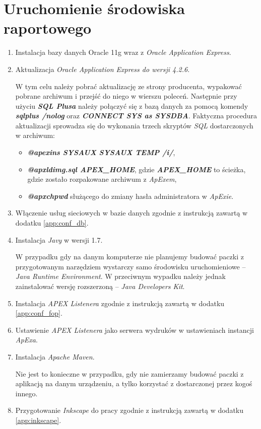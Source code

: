 \documentclass[11pt,a4paper]{article}
\begin{document}
\newpage

\section{Uruchomienie środowiska raportowego} \label{env}
\begin{enumerate}
	\item Instalacja bazy danych Oracle 11g wraz z \emph{Oracle Application Express}.
	\item Aktualizacja \emph{Oracle Application Express do wersji 4.2.6}.

W tym celu należy pobrać aktualizację ze strony producenta, wypakować pobrane archiwum i przejść do niego w wierszu poleceń. Następnie przy użyciu \emph{\textbf{SQL Plusa}} należy połączyć się z bazą danych za pomocą komendy \emph{\textbf{sqlplus /nolog}} oraz \emph{\textbf{CONNECT SYS as SYSDBA}}. Faktyczna procedura aktualizacji sprowadza się do wykonania trzech skryptów \emph{SQL} dostarczonych w archiwum:
\begin{itemize}
		\item \emph{\textbf{@apexins SYSAUX SYSAUX TEMP /i/}},
		\item \emph{\textbf{@apxldimg.sql APEX\_HOME}}, gdzie \emph{\textbf{APEX\_HOME}} to ścieżka, gdzie zostało rozpakowane archiwum z \emph{ApExem},
		\item \emph{\textbf{@apxchpwd}} służącego do zmiany hasła administratora w \emph{ApExie}.
\end{itemize}
	\item Włączenie usług sieciowych w bazie danych zgodnie z instrukcją zawartą w dodatku \ref{app:conf_db}.
	\item Instalacja \emph{Javy} w wersji 1.7.

W przypadku gdy na danym komputerze nie planujemy budować paczki z przygotowanym narzędziem wystarczy samo środowisku uruchomieniowe -- \emph{Java Runtime Environment}. W przeciwnym wypadku należy jednak zainstalować wersję rozszerzoną -- \emph{Java Developers Kit}.
	\item Instalacja \emph{APEX Listenera} zgodnie z instrukcją zawartą w dodatku \ref{app:conf_fop}.
	\item Ustawienie \emph{APEX Listenera} jako serwera wydruków w ustawieniach instancji \emph{ApExa}.
	\item Instalacja \emph{Apache Maven}.

Nie jest to konieczne w przypadku, gdy nie zamierzamy budować paczki z aplikacją na danym urządzeniu, a tylko korzystać z dostarczonej przez kogoś innego. 
	
	\item Przygotowanie \emph{Inkscape} do pracy zgodnie z instrukcją zawartą w dodatku \ref{app:inkscape}.
\end{enumerate}
\end{document}
